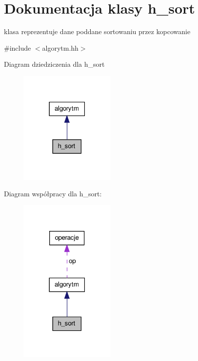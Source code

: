 \hypertarget{classh__sort}{\section{\-Dokumentacja klasy h\-\_\-sort}
\label{classh__sort}
}


klasa reprezentuje dane poddane sortowaniu przez kopcowanie  




{\ttfamily \#include $<$algorytm.\-hh$>$}



\-Diagram dziedziczenia dla h\-\_\-sort\nopagebreak
\begin{figure}[H]
\begin{center}
\leavevmode
\includegraphics[width=134pt]{classh__sort__inherit__graph}
\end{center}
\end{figure}


\-Diagram współpracy dla h\-\_\-sort\-:\nopagebreak
\begin{figure}[H]
\begin{center}
\leavevmode
\includegraphics[width=134pt]{classh__sort__coll__graph}
\end{center}
\end{figure}
